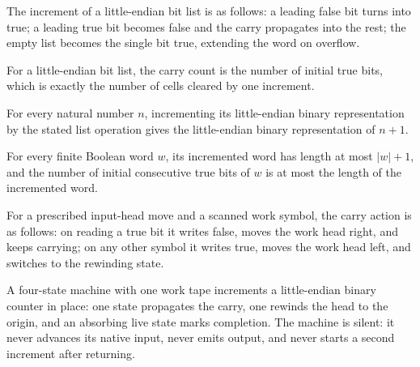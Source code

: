 \begin{definition}
\label{Complexity.clCountInc}
\leanok
The increment of a little-endian bit list is as follows: a leading false bit turns into true; a leading true bit becomes false and the carry propagates into the rest; the empty list becomes the single bit true, extending the word on overflow.
\end{definition}

\begin{definition}
\label{Complexity.clCountCarry}
\leanok
For a little-endian bit list, the carry count is the number of initial true bits, which is exactly the number of cells cleared by one increment.
\end{definition}

\begin{lemma}
\label{Complexity.clCountInc_bits}
\leanok
{}
For every natural number $n$, incrementing its little-endian binary representation by
the stated list operation gives the little-endian binary representation of $n+1$.
\end{lemma}

\begin{lemma}
\label{Complexity.clCountInc_length}
\leanok
{}
For every finite Boolean word $w$, its incremented word has length at most $|w|+1$, and
the number of initial consecutive true bits of $w$ is at most the length of the
incremented word.
\end{lemma}

\begin{definition}
\label{Complexity.clCountBump}
\leanok
{}
For a prescribed input-head move and a scanned work symbol, the carry action is as follows: on reading a true bit it writes false, moves the work head right, and keeps carrying; on any other symbol it writes true, moves the work head left, and switches to the rewinding state.
\end{definition}

\begin{definition}
\label{Complexity.clCountTM}
\leanok
{}
A four-state machine with one work tape increments a little-endian binary counter in place: one state propagates the carry, one rewinds the head to the origin, and an absorbing live state marks completion. The machine is silent: it never advances its native input, never emits output, and never starts a second increment after returning.
\end{definition}

